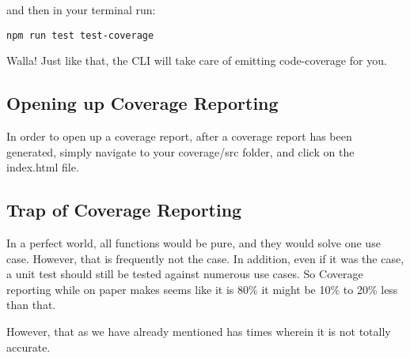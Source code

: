 and then in your terminal run:
\begin{verbatim}
npm run test test-coverage
\end{verbatim}

Walla! Just like that, the CLI will take care of emitting code-coverage for you.

\subsection{ Opening up Coverage Reporting }
In order to open up a coverage report, after a coverage report has been
generated, simply navigate to your coverage/src folder, and click on the
index.html file.


\subsection{ Trap of Coverage Reporting }
In a perfect world, all functions would be pure, and they would solve one
use case. However, that is frequently not the case. In addition, even if it was
the case, a unit test should still be tested against numerous use cases. So
Coverage reporting while on paper makes seems like it is 80\% it might be 10\%
to 20\% less than that.


However, that as we have already mentioned has times wherein it is not totally
accurate.

